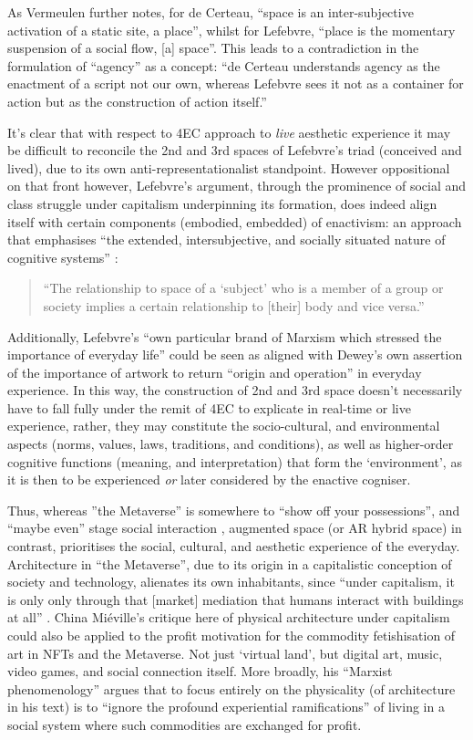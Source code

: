 As Vermeulen further notes, for de Certeau, “space is an inter-subjective activation of a static site, a place”, whilst for Lefebvre, “place is the momentary suspension of a social flow, [a] space”. This leads to a contradiction in the formulation of “agency” as a concept: “de Certeau understands agency as the enactment of a script not our own, whereas Lefebvre sees it not as a container for action but as the construction of action itself.” 

It’s clear that with respect to 4EC approach to \textit{live} aesthetic experience it may be difficult to reconcile the 2nd and 3rd spaces of Lefebvre’s triad (conceived and lived), due to its own anti-representationalist standpoint. However oppositional on that front however, Lefebvre’s argument, through the prominence of social and class struggle under capitalism underpinning its formation, does indeed align itself with certain components (embodied, embedded) of enactivism: an approach that emphasises “the extended, intersubjective, and socially situated nature of cognitive systems” \citep[p. 6]{gallagher2017}: 
\begin{quote}
    “The relationship to space of a ‘subject’ who is a member of a group or society implies a certain relationship to [their] body and vice versa.” \cite[p. 40]{lefebvre1991}
\end{quote}
Additionally, Lefebvre’s “own particular brand of Marxism which stressed the importance of everyday life” \citep[p. 8]{merrifield1993} could be seen as aligned with Dewey’s own assertion of the importance of artwork to return “origin and operation” in everyday experience. In this way, the construction of 2nd and 3rd space doesn't necessarily have to fall fully under the remit of 4EC to explicate in real-time or live experience, rather, they may constitute the socio-cultural, and environmental aspects (norms, values, laws, traditions, and  conditions), as well as higher-order cognitive functions (meaning, and interpretation) that form the ‘environment’, as it is then to be experienced \textit{or} later considered by the enactive cogniser.

Thus, whereas ”the Metaverse” is somewhere to “show off your possessions”, and “maybe even” stage social interaction \citep{marr2022}, augmented space (or AR hybrid space) in contrast, prioritises the social, cultural, and aesthetic experience of the everyday. Architecture in “the Metaverse”, due to its origin in a capitalistic conception of society and technology, alienates its own inhabitants, since “under capitalism, it is only only through that [market] mediation that humans interact with buildings at all” \citep[p. 18]{mieville1998}. China Miéville’s critique here of physical architecture under capitalism could also be applied to the profit motivation for the commodity fetishisation of art in NFTs and the Metaverse. Not just ‘virtual land’, but digital art, music, video games, and social connection itself. More broadly, his “Marxist phenomenology” argues that to focus entirely on the physicality (of architecture in his text) is to “ignore the profound experiential ramifications” of living in a social system where such commodities are exchanged for profit. 


